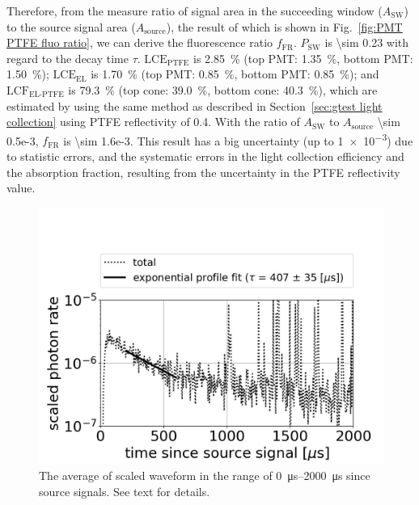 Therefore, from the measure ratio of signal area in the succeeding window ($A_{\text{SW}}$) to the source signal area ($A_{\text{source}}$), the result of which is shown in Fig.~\ref{fig:PMT PTFE fluo ratio}, we can derive the fluorescence ratio $f_{\text{FR}}$. 
$P_{\text{SW}}$ is \num{\sim 0.23} with regard to the decay time $\tau$. $\text{LCE}_{\text{PTFE}}$ is \SI{2.85}{\percent} (top PMT: \SI{1.35}{\percent}, bottom PMT: \SI{1.50}{\percent}); $\text{LCE}_{\text{EL}}$ is \SI{1.70}{\percent} (top PMT: \SI{0.85}{\percent}, bottom PMT: \SI{0.85}{\percent}); and $\text{LCF}_{\text{EL-PTFE}}$ is \SI{79.3}{\percent} (top cone: \SI{39.0}{\percent}, bottom cone: \SI{40.3}{\percent}), which are estimated by using the same method as described in Section~\ref{sec:gtest light collection} using PTFE reflectivity of \num{0.4}. With the ratio of $A_{\text{SW}}$ to $A_{\text{source}}$ \num{\sim 0.5e-3}, $f_{\text{FR}}$ is \num{\sim 1.6e-3}. This result has a big uncertainty (up to \num{1e-3}) due to statistic errors, and the systematic errors in the light collection efficiency and the absorption fraction, resulting from the uncertainty in the PTFE reflectivity value. 

\begin{figure}[!p]
		\centering
		\includegraphics[width=.8\textwidth,clip,trim={0 0 0 0},angle=0,origin=c]{Figures/GasTest/DatasetQuality/PMTPTFEFluoTau0200060064767.jpg}
		\caption[The average of scaled waveform in the range of \SIrange{0}{2000}{\us} since source signals.]{The average of scaled waveform in the range of \SIrange{0}{2000}{\us} since source signals. See text for details.}
		\label{fig:PMT PTFE fluo tau}
	\end{figure}

